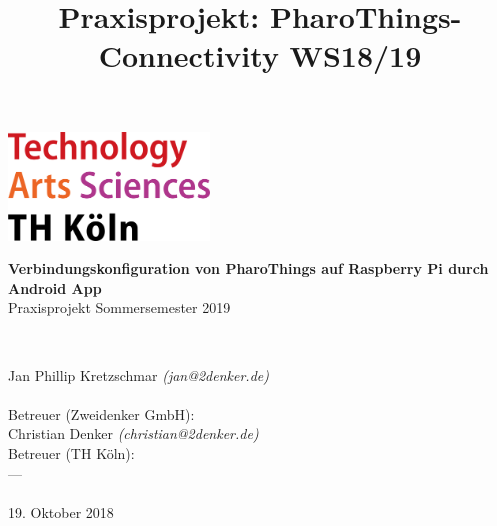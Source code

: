 \documentclass[12pt,a4paper]{article}
\title{Praxisprojekt: PharoThings-Connectivity WS18/19}
\begin{document}
	\begin{titlepage}
    \includegraphics[width=0.4\textwidth]{th_logo.png}
    ~\\[2.5cm]
    \begin{center}
    \textbf{\huge Verbindungskonfiguration von PharoThings auf Raspberry Pi durch Android App}\\[0.5cm]
    {\Large Praxisprojekt Sommersemester 2019}
    \vfill
    \end{center}
    ~\\[2.0cm]
    \begin{flushright}
    {\large Jan Phillip Kretzschmar \it{(jan@2denker.de)}}\\[0.1cm]
    ~\\[1.0cm]
    {\large Betreuer (Zweidenker GmbH):}\\[0.1cm]
    {\large Christian Denker \it{(christian@2denker.de)}}
    ~\\[0.5cm]
    {\large Betreuer (TH Köln):}\\[0.1cm]
    {\large ---}\\[0.1cm]

	~\\[1.0cm]
    {\large 19. Oktober 2018}
	\end{flushright}
    \end{titlepage}
    
\end{document}
